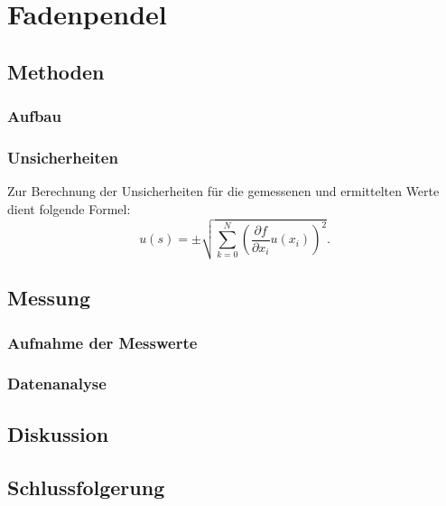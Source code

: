 \section{Fadenpendel} %
	
	\subsection{Methoden}
		
		\subsubsection{Aufbau}
			
		\subsubsection{Unsicherheiten}
			
			Zur Berechnung der Unsicherheiten für die gemessenen und ermittelten Werte dient folgende Formel: 
			\begin{equation*}
				u(s) = \pm \sqrt{\sum_{k=0}^{N}\left( \frac{\partial f}{\partial x_i}u(x_i)\right) ^2}. \label{eq:kombUnsicherheit}
			\end{equation*}
	
	\subsection{Messung}
	
		\subsubsection{Aufnahme der Messwerte}
	
		\subsubsection{Datenanalyse}	

	\subsection{Diskussion}
		
	\subsection{Schlussfolgerung}
	